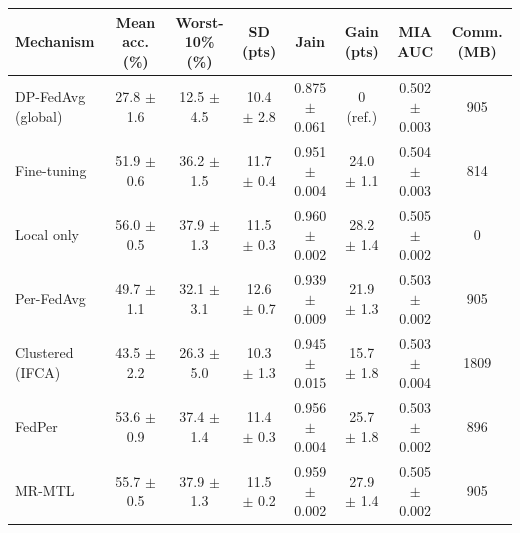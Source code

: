 \begin{tabular}{lccccccc}
\toprule
Mechanism & Mean acc. (\%) & Worst-10\% (\%) & SD (pts) & Jain & Gain (pts) & MIA AUC & Comm. (MB) \\
\midrule
DP-FedAvg (global) & 27.8 $\pm$ 1.6 & 12.5 $\pm$ 4.5 & 10.4 $\pm$ 2.8 & 0.875 $\pm$ 0.061 & 0 (ref.) & 0.502 $\pm$ 0.003 & 905 \\
Fine-tuning & 51.9 $\pm$ 0.6 & 36.2 $\pm$ 1.5 & 11.7 $\pm$ 0.4 & 0.951 $\pm$ 0.004 & 24.0 $\pm$ 1.1 & 0.504 $\pm$ 0.003 & 814 \\
Local only & 56.0 $\pm$ 0.5 & 37.9 $\pm$ 1.3 & 11.5 $\pm$ 0.3 & 0.960 $\pm$ 0.002 & 28.2 $\pm$ 1.4 & 0.505 $\pm$ 0.002 & 0 \\
Per-FedAvg & 49.7 $\pm$ 1.1 & 32.1 $\pm$ 3.1 & 12.6 $\pm$ 0.7 & 0.939 $\pm$ 0.009 & 21.9 $\pm$ 1.3 & 0.503 $\pm$ 0.002 & 905 \\
Clustered (IFCA) & 43.5 $\pm$ 2.2 & 26.3 $\pm$ 5.0 & 10.3 $\pm$ 1.3 & 0.945 $\pm$ 0.015 & 15.7 $\pm$ 1.8 & 0.503 $\pm$ 0.004 & 1809 \\
FedPer & 53.6 $\pm$ 0.9 & 37.4 $\pm$ 1.4 & 11.4 $\pm$ 0.3 & 0.956 $\pm$ 0.004 & 25.7 $\pm$ 1.8 & 0.503 $\pm$ 0.002 & 896 \\
MR-MTL & 55.7 $\pm$ 0.5 & 37.9 $\pm$ 1.3 & 11.5 $\pm$ 0.2 & 0.959 $\pm$ 0.002 & 27.9 $\pm$ 1.4 & 0.505 $\pm$ 0.002 & 905 \\
\bottomrule
\end{tabular}
